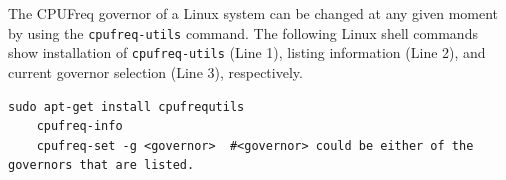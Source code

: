 The CPUFreq governor of a Linux system can be changed at any given moment by using the \texttt{cpufreq-utils} command. The following Linux shell commands show installation of \texttt{cpufreq-utils} (Line 1), listing information (Line 2), and current governor selection (Line 3), respectively.
\begin{lstlisting}[style=bash]
	sudo apt-get install cpufrequtils
	cpufreq-info
	cpufreq-set -g <governor>  #<governor> could be either of the governors that are listed.
\end{lstlisting}


